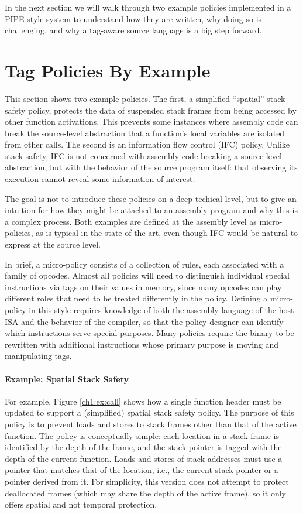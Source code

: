 In the next section we will walk through two example policies implemented in a PIPE-style
system to understand how they are written, why doing so is challenging,
and why a tag-aware source language is a big step forward.

\section{Tag Policies By Example}

This section shows two example policies. The first, a simplified ``spatial''
stack safety policy, protects the data of suspended stack frames from being accessed by
other function activations. This prevents some instances where assembly
code can break the source-level abstraction that a function's local variables are isolated
from other calls. The second is an information flow control (IFC) policy. Unlike stack safety,
IFC is not concerned with assembly code breaking a source-level abstraction, but with
the behavior of the source program itself: that observing its execution cannot reveal
some information of interest.

The goal is not to introduce these policies on a deep techical level, but to give an
intuition for how they might be attached to an assembly program and why this is a complex
process. Both examples are defined at the assembly level as micro-policies,
as is typical in the state-of-the-art, even though IFC would be natural to express at the
source level.

In brief, a micro-policy consists of a collection of rules, each associated with a family
of opcodes. Almost all policies will need to distinguish individual special instructions
via tags on their values in memory, since many opcodes can play different roles that need to be
treated differently in the policy. Defining a micro-policy in this style requires knowledge
of both the assembly language of the host ISA and the behavior of the compiler, so that the
policy designer can identify which instructions serve special purposes. Many policies require
the binary to be rewritten with additional instructions whose primary purpose is moving and
manipulating tags.

\paragraph{Example: Spatial Stack Safety}

For example, Figure \ref{ch1:ex:call} shows how a single function header must be updated to
support a (simplified) spatial stack safety policy. The purpose of this policy is to prevent
loads and stores to stack frames other than that of the active function.
The policy is conceptually simple:
each location in a stack frame is identified by the depth of the frame, and the stack pointer
is tagged with the depth of the current function.  Loads and stores of stack
addresses must use a pointer that matches that of the location, i.e., the current stack pointer
or a pointer derived from it. For simplicity, this version does not attempt to protect deallocated
frames (which may share the depth of the active frame), so it only offers spatial and not temporal
protection.


